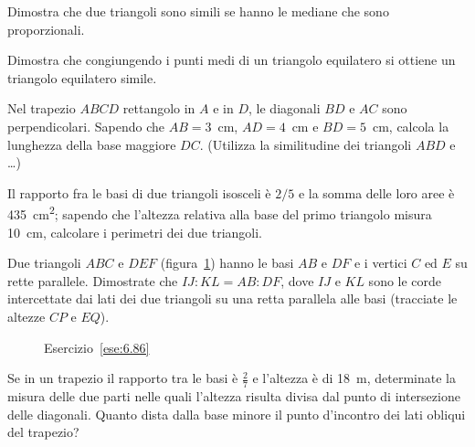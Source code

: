 \begin{multicols}{2}
\begin{esercizio}
\label{ese:6.82}
Dimostra che due triangoli sono simili se hanno le mediane che sono 
proporzionali.
\end{esercizio}

\begin{esercizio}
\label{ese:6.83}
Dimostra che congiungendo i punti medi di un triangolo equilatero si 
ottiene un triangolo equilatero simile.
\end{esercizio}

\begin{esercizio}
\label{ese:6.84}
Nel trapezio \(ABCD\) rettangolo in \(A\) e in \(D\), le diagonali \(BD\) e 
\(AC\) sono perpendicolari. Sapendo che \(AB=3\)~cm, \(AD=4\)~cm e 
\(BD=5\)~cm, calcola la lunghezza della base maggiore \(DC\). (Utilizza 
la similitudine dei triangoli \(ABD\) e \ldots{})
\end{esercizio}

\begin{esercizio}
\label{ese:6.85}
Il rapporto fra le basi di due triangoli isosceli è \(2/5\) e la somma 
delle loro aree è 435~cm\textsuperscript{2}; sapendo che l'altezza 
relativa alla base del primo triangolo misura 10~cm, calcolare i 
perimetri dei due triangoli. 
\end{esercizio}

\begin{esercizio}
\label{ese:6.86}
Due triangoli \(ABC\) e \(DEF\) (figura~\ref{fig:ese6.86}) hanno le basi 
\(AB\) e \(DF\) e i vertici \(C\) ed \(E\) su rette parallele. Dimostrate che 
\(IJ:KL=AB:DF\), dove \(IJ\) e \(KL\) sono le corde intercettate dai lati 
dei due triangoli su una retta parallela alle basi (tracciate le 
altezze \(CP\) e \(EQ\)).
\end{esercizio}


\begin{inaccessibleblock}
 \begin{figure}[!htb]
	\centering
	\caption{Esercizio~\ref{ese:6.86}}\label{fig:ese6.86}
\end{figure}
\end{inaccessibleblock}

\begin{esercizio}
\label{ese:6.87}
Se in un trapezio il rapporto tra le basi è \(\frac{2}{7}\) e l'altezza 
è di 18~m, determinate la misura delle due parti nelle quali 
l'altezza risulta divisa dal punto di intersezione delle diagonali. 
Quanto dista dalla base minore il punto d'incontro dei lati obliqui 
del trapezio?
\end{esercizio}


\end{multicols}
